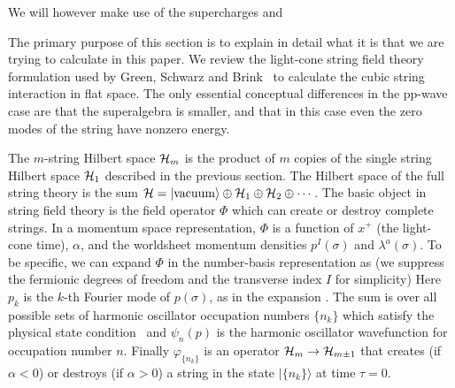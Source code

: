 We will however make
use of the supercharges
\eqn{}
and
\eqn{}


The primary purpose of this section is to explain in detail
what it is that we are trying to calculate in this paper.
We review the light-cone string field theory
formulation used by Green, Schwarz and Brink \GSB\ to calculate
the cubic string interaction in flat space.
The only essential
conceptual
differences in the pp-wave case are that the superalgebra is smaller,
and that in this case
even the zero modes of the string have nonzero energy.


The $m$-string Hilbert space ${\cal{H}}_m$
is the product of $m$ copies of the single string Hilbert
space ${\cal{H}}_1$ described in the previous section.
The Hilbert space of the full string theory is the
sum ${\cal{H}} = |{\rm vacuum}\rangle \oplus
{\cal{H}}_1 \oplus {\cal{H}}_2 \oplus \cdots$.
The basic object in string field theory is the field operator
$\Phi$ which can create or destroy complete strings.
In a momentum space
representation, $\Phi$ is a function of $x^+$ (the light-cone time),
$\alpha$, and the worldsheet momentum
densities $p^I(\sigma)$ and
$\lambda^a(\sigma)$.
To be specific, we can expand $\Phi$ in the number-basis representation
as (we suppress the fermionic degrees of freedom and the transverse
index $I$ for simplicity)
\eqn{}
Here $p_k$ is the $k$-th Fourier mode of
$p(\sigma)$, as in the expansion \xandp.
The sum is over all possible sets of harmonic oscillator
occupation numbers $\{n_k\}$ which satisfy the physical state
condition \physical\ 
and $\psi_n(p)$ is the harmonic oscillator wavefunction for
occupation number $n$.
Finally $\varphi_{\{n_k\}}$ is an operator ${\cal{H}}_m \to {\cal{H}}_{m
\pm 1}$ that
creates  (if $\alpha<0$) or destroys (if $\alpha>0$) a string
in the state $|\{n_k\}\rangle$ at time $\tau = 0$.


